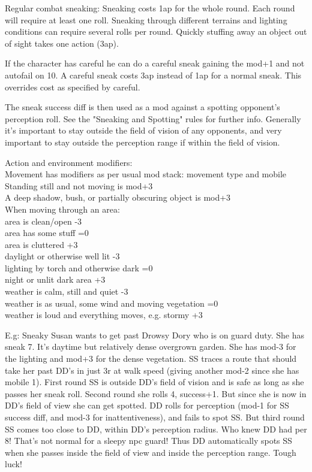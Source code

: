 Regular combat sneaking: Sneaking costs 1ap for the whole round. Each round will require at least one roll. Sneaking through different terrains and lighting conditions can require several rolls per round. Quickly stuffing away an object out of sight takes one action (3ap).

If the character has careful he can do a careful sneak gaining the mod+1 and not autofail on 10. A careful sneak costs 3ap instead of 1ap for a normal sneak. This overrides cost as specified by careful.

The sneak success diff is then used as a mod against a spotting opponent's perception roll. See the "Sneaking and Spotting" rules for further info.
Generally it's important to stay outside the field of vision of any opponents, and very important to stay outside the perception range if within the field of vision.

Action and environment modifiers:\\
Movement has modifiers as per usual mod stack: movement type and mobile\\
Standing still and not moving is mod+3\\
A deep shadow, bush, or partially obscuring object is mod+3\\

When moving through an area:\\
area is clean/open -3\\
area has some stuff =0\\
area is cluttered +3\\
daylight or otherwise well lit -3\\
lighting by torch and otherwise dark =0\\
night or unlit dark area +3\\
weather is calm, still and quiet -3\\
weather is as usual, some wind and moving vegetation =0\\
weather is loud and everything moves, e.g. stormy  +3

E.g: Sneaky Susan wants to get past Drowsy Dory who is on guard duty. She has sneak 7. It's daytime but relatively dense overgrown garden. She has mod-3 for the lighting and mod+3 for the dense vegetation. SS traces a route that should take her past DD's in just 3r at walk speed (giving another mod-2 since she has mobile 1). First round SS is outside DD's field of vision and is safe as long as she passes her sneak roll. Second round she rolls 4, success+1. But since she is now in DD's field of view she can get spotted. DD rolls for perception (mod-1 for SS success diff, and mod-3 for inattentiveness), and fails to spot SS. But third round SS comes too close to DD, within DD's perception radius. Who knew DD had per 8! That's not normal for a sleepy npc guard! Thus DD automatically spots SS when she passes inside the field of view and inside the perception range. Tough luck!

